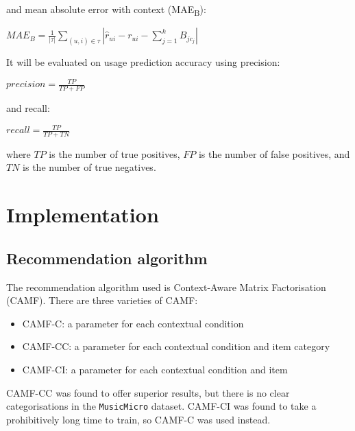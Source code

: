 \documentclass[conference]{IEEEtran}
\begin{document}
and mean absolute error with context (MAE\textsubscript{B}):

\begin{center}

$MAE_B = \frac{1}{|\tau|} \sum_{(u, i) \in \tau} |\hat{r}_{ui} - r_{ui} - \sum_{j=1}^{k} B_{jc_j}|$

\end{center}

It will be evaluated on usage prediction accuracy using precision:

\begin{center}

$precision = \frac{TP}{TP + FP}$

\end{center}

and recall:

\begin{center}

$recall = \frac{TP}{TP + TN}$

\end{center}

where $TP$ is the number of true positives, $FP$ is the number of false positives, and $TN$ is the number of true negatives.

\section{Implementation}

\subsection{Recommendation algorithm}

The recommendation algorithm used is Context-Aware Matrix Factorisation (CAMF). There are three varieties of CAMF:

\begin{itemize}

	\item{CAMF-C: a parameter for each contextual condition}
	\item{CAMF-CC: a parameter for each contextual condition and item category}
	\item{CAMF-CI: a parameter for each contextual condition and item}

\end{itemize}

CAMF-CC was found to offer superior results, but there is no clear categorisations in the \verb|MusicMicro| dataset. CAMF-CI was found to take a prohibitively long time to train, so CAMF-C was used instead.
\end{document}
